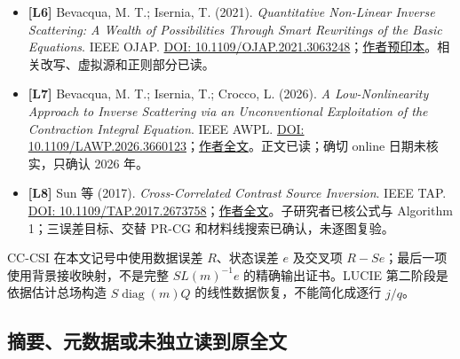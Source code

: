 \documentclass[10pt,a4paper]{article}
\begin{document}
\begin{itemize}
\item
  \textbf{{[}L6{]}} Bevacqua, M. T.; Isernia, T. (2021).
  \emph{Quantitative Non-Linear Inverse Scattering: A Wealth of
  Possibilities Through Smart Rewritings of the Basic Equations}. IEEE
  OJAP. \href{https://doi.org/10.1109/OJAP.2021.3063248}{DOI:
  10.1109/OJAP.2021.3063248}；\href{https://arxiv.org/abs/2012.15252}{作者预印本}。相关改写、虚拟源和正则部分已读。
\item
  \textbf{{[}L7{]}} Bevacqua, M. T.; Isernia, T.; Crocco, L. (2026).
  \emph{A Low-Nonlinearity Approach to Inverse Scattering via an
  Unconventional Exploitation of the Contraction Integral Equation}.
  IEEE AWPL. \href{https://doi.org/10.1109/LAWP.2026.3660123}{DOI:
  10.1109/LAWP.2026.3660123}；\href{https://www.researchgate.net/publication/400394332_A_Low-Nonlinearity_Approach_to_Inverse_Scattering_via_an_Unconventional_Exploitation_of_the_Contraction_Integral_Equation}{作者全文}。正文已读；确切
  online 日期未核实，只确认 2026 年。
\item
  \textbf{{[}L8{]}} Sun 等 (2017). \emph{Cross-Correlated Contrast
  Source Inversion}. IEEE TAP.
  \href{https://doi.org/10.1109/TAP.2017.2673758}{DOI:
  10.1109/TAP.2017.2673758}；\href{https://arxiv.org/abs/1906.10864}{作者全文}。子研究者已核公式与
  Algorithm 1；三误差目标、交替 PR-CG 和材料线搜索已确认，未逐图复验。
\end{itemize}

CC-CSI 在本文记号中使用数据误差 \(R\)、状态误差 \(e\) 及交叉项
\(R-Se\)；最后一项使用背景接收映射，不是完整 \(SL(m)^{-1}e\)
的精确输出证书。LUCIE 第二阶段是依据估计总场构造
\(S\operatorname{diag}(m)\widehat Q\) 的线性数据恢复，不能简化成逐行
\(j/q\)。

\hypertarget{ux6458ux8981ux5143ux6570ux636eux6216ux672aux72ecux7acbux8bfbux5230ux539fux5168ux6587}{%
\subsection{摘要、元数据或未独立读到原全文}\label{ux6458ux8981ux5143ux6570ux636eux6216ux672aux72ecux7acbux8bfbux5230ux539fux5168ux6587}}
\end{document}
